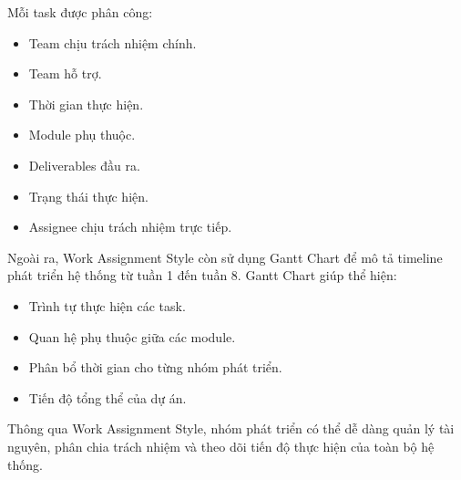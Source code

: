 Mỗi task được phân công:
\begin{itemize}
    \item Team chịu trách nhiệm chính.
    \item Team hỗ trợ.
    \item Thời gian thực hiện.
    \item Module phụ thuộc.
    \item Deliverables đầu ra.
    \item Trạng thái thực hiện.
    \item Assignee chịu trách nhiệm trực tiếp.
\end{itemize}

Ngoài ra, Work Assignment Style còn sử dụng Gantt Chart để mô tả timeline phát triển hệ thống từ tuần 1 đến tuần 8.  
Gantt Chart giúp thể hiện:
\begin{itemize}
    \item Trình tự thực hiện các task.
    \item Quan hệ phụ thuộc giữa các module.
    \item Phân bổ thời gian cho từng nhóm phát triển.
    \item Tiến độ tổng thể của dự án.
\end{itemize}

Thông qua Work Assignment Style, nhóm phát triển có thể dễ dàng quản lý tài nguyên, phân chia trách nhiệm và theo dõi tiến độ thực hiện của toàn bộ hệ thống.

